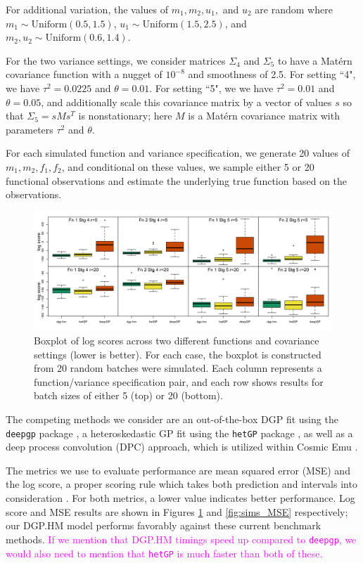 \documentclass[11pt]{article}
\begin{document}
For additional variation, the values of $m_1, m_2, u_1,$ and $u_2$ are random where $m_1 \sim \text{Uniform}(0.5,1.5)$, $u_1 \sim \text{Uniform}(1.5,2.5)$, and $m_2,u_2 \sim \text{Uniform}(0.6,1.4)$. 
      
For the two variance settings, we consider matrices $\Sigma_4$ and $\Sigma_5$ to have a Mat\'ern covariance function with a nugget of $10^{-8}$ and smoothness of 2.5. For setting ``4", we have $\tau^2=0.0225$ and $\theta=0.01$. For setting ``5", we we have $\tau^2=0.01$ and $\theta=0.05$, and additionally scale this covariance matrix by a vector of values $s$ so that $\Sigma_5 = s M s^T$ is nonstationary; here $M$ is a Mat\'ern covariance matrix with parameters $\tau^2$ and $\theta$.

For each simulated function and variance specification, we generate 20 values of $m_1, m_2, f_1, f_2$, and conditional on these values, we sample either 5 or 20 functional observations and estimate the underlying true function based on the observations.

\begin{figure}[t]
    \centering
    \includegraphics[width=6in]{sims_logS.png}
    \caption{Boxplot of log scores across two different functions and covariance settings (lower is better). For each case, the boxplot is constructed from 20 random batches were simulated. Each column represents a function/variance specification pair, and each row shows results for batch sizes of either 5 (top) or 20 (bottom).}
    \label{fig:sims_logS}
\end{figure}

The competing methods we consider are an out-of-the-box DGP fit using the \texttt{deepgp} package \citep{sauer2023active}, a heteroskedastic GP fit using the \texttt{hetGP} package \citep{binois2018practical, binois2021hetgp}, as well as a deep process convolution (DPC) approach, which is utilized within Cosmic Emu \citep{moran2023mira}. 

The metrics we use to evaluate performance are mean squared error (MSE) and the log score, a proper scoring rule which takes both prediction and intervals into consideration \citep{gneiting2007strictly}. For both metrics, a lower value indicates better performance. Log score and MSE results are shown in Figures \ref{fig:sims_logS} and \ref{fig:sims_MSE} respectively; our DGP.HM model performs favorably against these current benchmark methods. \textcolor{magenta}{If we mention that DGP.HM timings speed up compared to \texttt{deepgp}, we would also need to mention that \texttt{hetGP} is much faster than both of these.}
\end{document}
